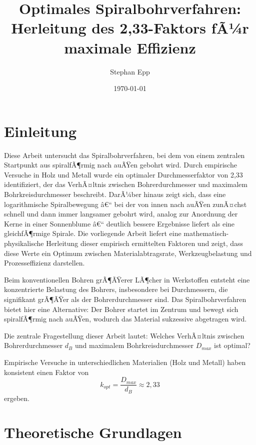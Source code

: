 ﻿\documentclass[12pt,a4paper]{article}
\title{Optimales Spiralbohrverfahren:\\Herleitung des 2,33-Faktors fÃ¼r maximale Effizienz}
\author{Stephan Epp}
\date{\today}
\begin{document}
\renewcommand{\labelitemi}{--}
\renewcommand{\labelitemii}{--}
\renewcommand{\labelitemiii}{--}

	
\maketitle

\tableofcontents

\newpage

\section{Einleitung}
Diese Arbeit untersucht das Spiralbohrverfahren, bei dem von einem zentralen Startpunkt aus spiralfÃ¶rmig nach auÃŸen gebohrt wird. Durch empirische Versuche in Holz und Metall wurde ein optimaler Durchmesserfaktor von 2,33 identifiziert, der das VerhÃ¤ltnis zwischen Bohrerdurchmesser und maximalem Bohrkreisdurchmesser beschreibt. DarÃ¼ber hinaus zeigt sich, dass eine logarithmische Spiralbewegung â€“ bei der von innen nach auÃŸen zunÃ¤chst schnell und dann immer langsamer gebohrt wird, analog zur Anordnung der Kerne in einer Sonnenblume â€“ deutlich bessere Ergebnisse liefert als eine gleichfÃ¶rmige Spirale. Die vorliegende Arbeit liefert eine mathematisch-physikalische Herleitung dieser empirisch ermittelten Faktoren und zeigt, dass diese Werte ein Optimum zwischen Materialabtragsrate, Werkzeugbelastung und Prozesseffizienz darstellen.
	
Beim konventionellen Bohren grÃ¶ÃŸerer LÃ¶cher in Werkstoffen entsteht eine konzentrierte Belastung des Bohrers, insbesondere bei Durchmessern, die signifikant grÃ¶ÃŸer als der Bohrerdurchmesser sind. Das Spiralbohrverfahren bietet hier eine Alternative: Der Bohrer startet im Zentrum und bewegt sich spiralfÃ¶rmig nach auÃŸen, wodurch das Material sukzessive abgetragen wird.

Die zentrale Fragestellung dieser Arbeit lautet: Welches VerhÃ¤ltnis zwischen Bohrerdurchmesser $d_B$ und maximalem Bohrkreisdurchmesser $D_{max}$ ist optimal?

Empirische Versuche in unterschiedlichen Materialien (Holz und Metall) haben konsistent einen Faktor von
\begin{equation}
	k_{opt} = \frac{D_{max}}{d_B} \approx 2{,}33
\end{equation}
ergeben.

\section{Theoretische Grundlagen}
\end{document}
